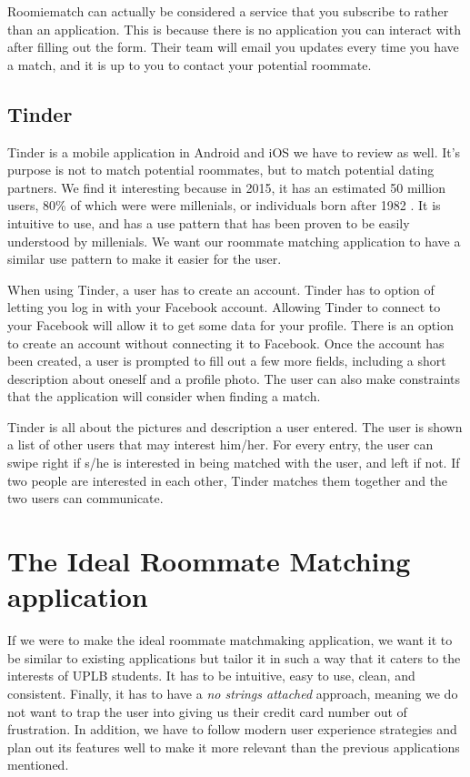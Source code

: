 \documentclass[journal]{./IEEE/IEEEtran}
\begin{document}
Roomiematch can actually be considered a service that you subscribe to rather than an application. This is because there is no application you can interact with after filling out the form. Their team will email you updates every time you have a match, and it is up to you to contact your potential roommate.

\subsection{Tinder}
Tinder is a mobile application in Android and iOS we have to review as well. It's purpose is not to match potential roommates, but to match potential dating partners. We find it interesting because in 2015, it has an estimated 50 million users\cite{tinderstat2}, 80\% of which were were millenials, or individuals born after 1982 \cite{tinderstat}\cite{millenial}. It is intuitive to use, and has a use pattern that has been proven to be easily understood by millenials. We want our roommate matching application to have a similar use pattern to make it easier for the user.

When using Tinder, a user has to create an account. Tinder has to option of letting you log in with your Facebook account. Allowing Tinder to connect to your Facebook will allow it to get some data for your profile. There is an option to create an account without connecting it to Facebook. Once the account has been created, a user is prompted to fill out a few more fields, including a short description about oneself and a profile photo. The user can also make constraints that the application will consider when finding a match.

Tinder is all about the pictures and description a user entered. The user is shown a list of other users that may interest him/her. For every entry, the user can swipe right if s/he is interested in being matched with the user, and left if not. If two people are interested in each other, Tinder matches them together and the two users can communicate.

\section{The Ideal Roommate Matching application}
If we were to make the ideal roommate matchmaking application, we want it to be similar to existing applications but tailor it in such a way that it caters to the interests of UPLB students. It has to be intuitive, easy to use, clean, and consistent. Finally, it has to have a \textit{no strings attached} approach, meaning we do not want to trap the user into giving us their credit card number out of frustration. In addition, we have to follow modern user experience strategies and plan out its features well to make it more relevant than the previous applications mentioned.
\end{document}
